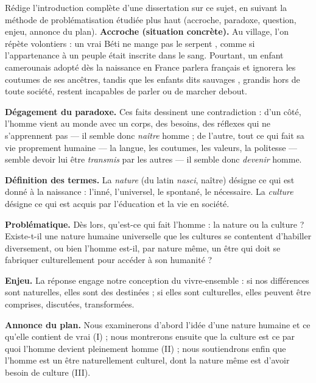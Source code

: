 \documentclass[11pt]{article}
\begin{document}
\begin{exoresolu}
Rédige l'introduction complète d'une dissertation sur ce sujet, en suivant la méthode de problématisation étudiée plus haut (accroche, paradoxe, question, enjeu, annonce du plan).
\tcblower
\textbf{Accroche (situation concrète).} Au village, l'on répète volontiers : \guillemotleft un vrai Béti ne mange pas le serpent \guillemotright, comme si l'appartenance à un peuple était inscrite dans le sang. Pourtant, un enfant camerounais adopté dès la naissance en France parlera français et ignorera les coutumes de ses ancêtres, tandis que les enfants dits \guillemotleft sauvages \guillemotright, grandis hors de toute société, restent incapables de parler ou de marcher debout.

\textbf{Dégagement du paradoxe.} Ces faits dessinent une contradiction : d'un côté, l'homme vient au monde avec un corps, des besoins, des réflexes qui ne s'apprennent pas --- il semble donc \emph{naître} homme ; de l'autre, tout ce qui fait sa vie proprement humaine --- la langue, les coutumes, les valeurs, la politesse --- semble devoir lui être \emph{transmis} par les autres --- il semble donc \emph{devenir} homme.

\textbf{Définition des termes.} La \emph{nature} (du latin \emph{nasci}, naître) désigne ce qui est donné à la naissance : l'inné, l'universel, le spontané, le nécessaire. La \emph{culture} désigne ce qui est acquis par l'éducation et la vie en société.

\textbf{Problématique.} Dès lors, qu'est-ce qui fait l'homme : la nature ou la culture ? Existe-t-il une nature humaine universelle que les cultures se contentent d'habiller diversement, ou bien l'homme est-il, par nature même, un être qui doit se fabriquer culturellement pour accéder à son humanité ?

\textbf{Enjeu.} La réponse engage notre conception du vivre-ensemble : si nos différences sont naturelles, elles sont des destinées ; si elles sont culturelles, elles peuvent être comprises, discutées, transformées.

\textbf{Annonce du plan.} Nous examinerons d'abord l'idée d'une nature humaine et ce qu'elle contient de vrai (I) ; nous montrerons ensuite que la culture est ce par quoi l'homme devient pleinement homme (II) ; nous soutiendrons enfin que l'homme est un être naturellement culturel, dont la nature même est d'avoir besoin de culture (III).
\end{exoresolu}
\end{document}
